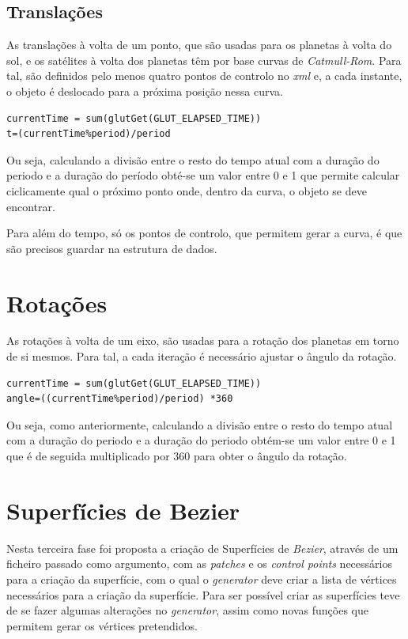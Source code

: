 \section{Translações }
As translações à volta de um ponto, que são usadas para os planetas à volta do sol, e os satélites à volta dos planetas têm por base curvas de \textit{Catmull-Rom}. Para tal, são definidos pelo menos quatro pontos de controlo no \textit{xml} e, a cada instante, o objeto é deslocado para a próxima posição nessa curva.

\begin{verbatim}
currentTime = sum(glutGet(GLUT_ELAPSED_TIME))
t=(currentTime%period)/period
\end{verbatim}

Ou seja, calculando a divisão entre o resto do tempo atual com a duração do periodo e a duração do período obté-se um valor entre 0 e 1 que permite calcular ciclicamente qual o próximo ponto onde, dentro da curva, o objeto se deve encontrar.

Para além do tempo, só os pontos de controlo, que permitem gerar a curva, é que são precisos guardar na estrutura de dados.

\chapter{Rotações}

As rotações à volta de um eixo, são usadas para a rotação dos planetas em torno de si mesmos. Para tal, a cada iteração é necessário ajustar o ângulo da rotação.

\begin{verbatim}
currentTime = sum(glutGet(GLUT_ELAPSED_TIME))
angle=((currentTime%period)/period) *360
\end{verbatim}

Ou seja, como anteriormente, calculando a divisão entre o resto do tempo atual com a duração do periodo e a duração do periodo obtém-se um valor entre 0 e 1 que é de seguida multiplicado por 360 para obter o ângulo da rotação.


\chapter{Superfícies de Bezier}

Nesta terceira fase foi proposta a criação de Superfícies de \textit{Bezier}, através de um ficheiro passado como argumento, com as \textit{patches} e os \textit{control points} necessários para a criação da superfície, com o qual o \textit{generator} deve criar a lista de vértices necessários para a criação da superfície. Para ser possível criar as superfícies teve de se fazer algumas alterações no \textit{generator}, assim como novas funções que permitem gerar os vértices pretendidos. 


